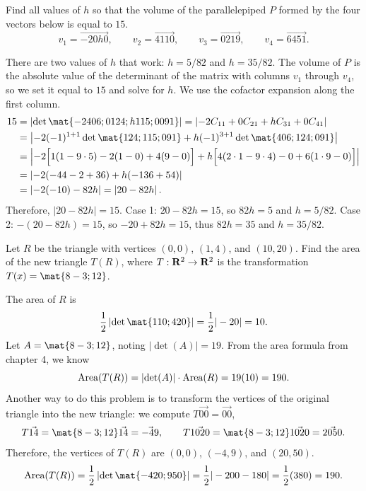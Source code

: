 \begin{problems}
\problem %
Find all values of $h$ so that the volume of the parallelepiped $P$ formed by the
four vectors below is equal to $15$.
\[v_1 = \vec{-2 0 h 0}, \qquad %
  v_2 = \vec{4 1 1 0}, \qquad %
  v_3 = \vec{0 2 1 9}, \qquad %
  v_4 = \vec{6 4 5 1}.\]

\begin{solution}
  There are two values of $h$ that work: $h = 5/82$ and $h = 35/82$.  The volume
  of $P$ is the absolute value of the determinant of the matrix with columns
  $v_1$ through $v_4$, so we set it equal to $15$ and solve for $h$.  We use the
  cofactor expansion along the first column.
  \begin{align*}
    15 & = \left|\det\mat{-2 4 0 6; 0 1 2 4; h 1 1 5; 0 0 9 1}\right| 
         = \left|-2C_{11} + 0 C_{21} + h C_{31} + 0 C_{41}\right| \\
       & = \left|-2(-1)^{1+1} \det\mat{1 2 4; 1 1 5; 0 9 1} + h(-1)^{3+1}
         \det\mat{4 0 6; 1 2 4; 0 9 1}\right| \\
       & = \left| -2 \Big[1(1-9\cdot 5)-2(1-0)+4(9-0)\Big]
         + h \Big[4(2\cdot 1-9 \cdot 4)-0+6(1 \cdot 9 -0)\Big] \right| \\
       & = \left| -2(-44-2+36) + h(-136+54)\right| \\
       & = \left|-2(-10) - 82h\right| = \left|20-82h\right|.         
  \end{align*}
  Therefore, $\left|20-82h\right| = 15$. \newline
  Case 1: $20-82h = 15$, so $82h = 5$ and $h = 5/82$. \newline %
  Case 2: $-(20-82h) = 15$, so $-20+82h = 15$, thus $82h = 35$
  and $h = 35/82$.
\end{solution}


\problem %
Let $R$ be the triangle with vertices $(0, 0)$, $(1, 4)$, and $(10, 20)$.  Find
the area of the new triangle $T(R)$, where $T: {\bf R}^2 \to {\bf R}^2$ is the
transformation $T(x) = \mat{8 -3; 1 2}$.

\begin{solution}
  The area of $R$ is
  \[\dfrac{1}{2} \left| \det\mat{1 10; 4 20}\right| = \dfrac{1}{2}|-20| = 10.\]
  Let $A = \mat{8 -3; 1 2}$, noting $|\det(A)| = 19$.  From the area formula from
  chapter 4, we know
  \[\textup{Area}(T(R)) = \left|\det(A)\right|\cdot \textup{Area}(R)
    = 19(10) = 190.\]
  Another way to do this problem is to transform the vertices of the original triangle
  into the new triangle: we compute $T\vec{0 0} = \vec{0 0}$, 
  \[T\vec{1 4} = \mat{8 -3; 1 2} \vec{1 4} = \vec{-4 9}, \qquad
    T\vec{10 20} = \mat{8 -3; 1 2} \vec{10 20} = \vec{20 50}.\]
  Therefore, the vertices of $T(R)$ are $(0, 0)$, $(-4,9)$, and $(20,50)$.
  \[\textup{Area}(T(R)) = \dfrac{1}{2}
    \left|\det\mat{-4 20; 9 50}\right| = \dfrac{1}{2} |-200-180| = \dfrac{1}{2}(380)
    = 190.\]
\end{solution}



\end{problems}
